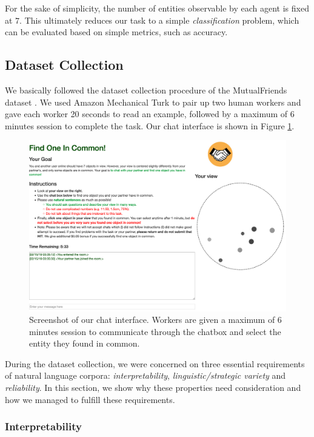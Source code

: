 \documentclass[letterpaper]{article}
\begin{document}
For the sake of simplicity, the number of entities observable by each agent is fixed at $7$. This ultimately reduces our task to a simple \textit{classification} problem, which can be evaluated based on simple metrics, such as accuracy.

\subsection{Dataset Collection}

We basically followed the dataset collection procedure of the MutualFriends dataset \cite{he2017learning}. We used Amazon Mechanical Turk to pair up two human workers and gave each worker 20 seconds to read an example, followed by a maximum of 6 minutes session to complete the task. Our chat interface is shown in Figure \ref{fig:annotation}.

\begin{figure}[ht]
\centering
\includegraphics[width=0.97\columnwidth]{annotation.png}
\caption{
Screenshot of our chat interface. Workers are given a maximum of 6 minutes session to communicate through the chatbox and select the entity they found in common.
}
\label{fig:annotation}
\end{figure}

During the dataset collection, we were concerned on three essential requirements of natural language corpora: \emph{interpretability}, \emph{linguistic/strategic variety} and \emph{reliability}. In this section, we show why these properties need consideration and how we managed to fulfill these requirements.

\subsubsection{Interpretability}
\end{document}
